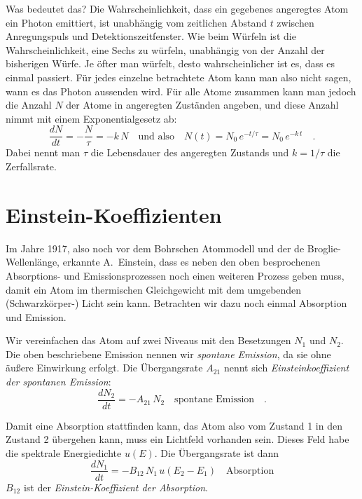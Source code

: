 Was bedeutet das? Die Wahrscheinlichkeit, dass ein gegebenes angeregtes Atom ein Photon emittiert, ist unabhängig vom zeitlichen Abstand $t$ zwischen Anregungspuls und Detektionszeitfenster. Wie beim Würfeln ist die Wahrscheinlichkeit, eine Sechs zu würfeln, unabhängig von der Anzahl der bisherigen Würfe. Je öfter man würfelt, desto wahrscheinlicher ist es, dass es einmal passiert. Für jedes einzelne betrachtete Atom kann man also nicht sagen, wann es das Photon aussenden wird. Für alle Atome zusammen kann man jedoch die Anzahl $N$ der Atome in angeregten Zuständen angeben, und diese Anzahl nimmt mit einem Exponentialgesetz ab: 
\begin{equation}
    \frac{d N}{dt} = - \frac{N}{\tau}  = -k \, N \quad \text{und also} \quad N(t) =  N_0 \, e^{- t / \tau}  = N_0 \, e^{- k \, t }  \quad .
\end{equation} 
Dabei nennt man $\tau$ die Lebensdauer des angeregten Zustands und $k = 1 / \tau$ die Zerfallsrate.


\section{Einstein-Koeffizienten}



Im Jahre 1917, also noch vor dem Bohrschen Atommodell und der de Broglie-Wellenlänge, erkannte A.~Einstein, dass es neben den oben besprochenen Absorptions- und Emissionsprozessen noch einen weiteren Prozess geben muss, damit ein Atom im thermischen Gleichgewicht mit dem umgebenden (Schwarzkörper-) Licht sein kann. Betrachten wir dazu noch einmal Absorption und Emission.

Wir vereinfachen das Atom auf zwei Niveaus mit den Besetzungen $N_1$ und $N_2$. Die oben beschriebene Emission nennen wir \emph{spontane Emission}, da sie ohne äußere Einwirkung erfolgt. Die Übergangsrate $A_{21}$ nennt sich \emph{Einsteinkoeffizient der spontanen Emission}:
\begin{equation}
    \frac{d N_2}{dt} = - A_{21} \, N_2  \quad \text{spontane Emission} \quad . \label{eq:7_k_spontan}
\end{equation}


Damit eine Absorption stattfinden kann, das Atom also vom Zustand 1 in den Zustand 2 übergehen kann, muss ein Lichtfeld vorhanden sein. Dieses Feld habe die spektrale Energiedichte $u(E)$. Die Übergangsrate ist dann
\begin{equation}
    \frac{d N_1}{dt} = - B_{12} \, N_1 \, u(E_2 - E_1) \quad \text{Absorption} \label{eq:7_k_abs}
\end{equation}
$B_{12}$ ist der \emph{Einstein-Koeffizient der Absorption}.


